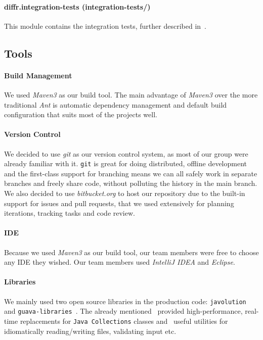 \paragraph{diffr.integration-tests (integration-tests/)}
This module contains the integration tests, further described in~.

\subsection{Tools}

\paragraph{Build Management}

We used \textit{Maven3} as our build tool. The main advantage of \textit{Maven3} over the more traditional \textit{Ant} is automatic dependency management and default build configuration that suits most of the projects well.

\paragraph{Version Control}
We decided to use \textit{git} as our version control system, as most of our group were already familiar with it. \texttt{git} is great for doing distributed, offline development and the first-class support for branching means we can all safely work in separate branches and freely share code, without polluting the history in the main branch. We also decided to use \textit{bitbucket.org} to host our repository due to the built-in support for issues and pull requests, that we used extensively for planning iterations, tracking tasks and code review.

\paragraph{IDE}
Because we used \textit{Maven3} as our build tool, our team members were free to choose any IDE they wished. Our team members used \textit{IntelliJ IDEA} and \textit{Eclipse}.

\paragraph{Libraries}
We mainly used two open source libraries in the production code: \texttt{javolution}~\cite{javolution} and \texttt{guava-libraries}~\cite{guava}. The already mentioned~\cite{javolution} provided high-performance, real-time replacements for \texttt{Java Collections} classes and~\cite{guava} useful utilities for idiomatically reading/writing files, validating input etc.

